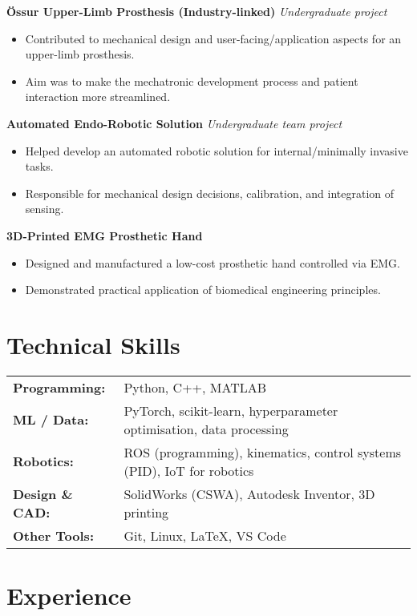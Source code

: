 \documentclass[a4paper,11pt]{article}
\begin{document}
\textbf{Össur Upper-Limb Prosthesis (Industry-linked)} \hfill \textit{Undergraduate project}
\begin{itemize}
    \item Contributed to mechanical design and user-facing/application aspects for an upper-limb prosthesis.
    \item Aim was to make the mechatronic development process and patient interaction more streamlined.
\end{itemize}

\textbf{Automated Endo-Robotic Solution} \hfill \textit{Undergraduate team project}
\begin{itemize}
    \item Helped develop an automated robotic solution for internal/minimally invasive tasks.
    \item Responsible for mechanical design decisions, calibration, and integration of sensing.
\end{itemize}

\textbf{3D-Printed EMG Prosthetic Hand}
\begin{itemize}
    \item Designed and manufactured a low-cost prosthetic hand controlled via EMG.
    \item Demonstrated practical application of biomedical engineering principles.
\end{itemize}

\section*{Technical Skills}

\begin{tabular}{@{}ll}
\textbf{Programming:} & Python, C++, MATLAB \\
\textbf{ML / Data:} & PyTorch, scikit-learn, hyperparameter optimisation, data processing \\
\textbf{Robotics:} & ROS (programming), kinematics, control systems (PID), IoT for robotics \\
\textbf{Design \& CAD:} & SolidWorks (CSWA), Autodesk Inventor, 3D printing \\
\textbf{Other Tools:} & Git, Linux, LaTeX, VS Code
\end{tabular}

\section*{Experience}
\end{document}
